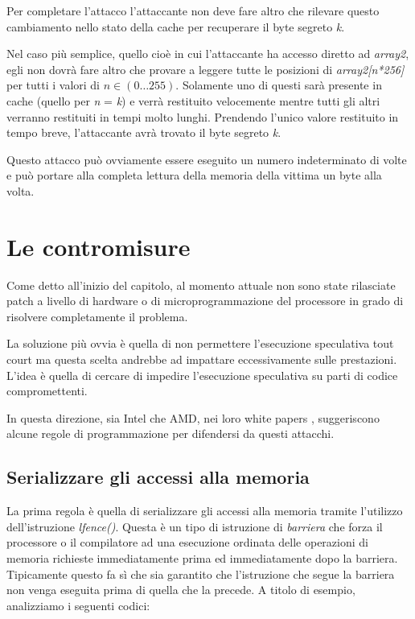 			Per completare l'attacco l'attaccante non deve fare altro che rilevare questo cambiamento nello stato della cache per recuperare il byte segreto \emph{k}.
			
			Nel caso più semplice, quello cioè in cui l'attaccante ha accesso diretto ad \emph{array2}, egli non dovrà fare altro che provare  a leggere tutte le posizioni di \emph{array2[n*256]} per tutti i valori di $n \in (0\dots255)$. Solamente uno di questi sarà presente in cache (quello per \emph{n} = \emph{k}) e verrà restituito velocemente mentre tutti gli altri verranno restituiti in tempi molto lunghi. Prendendo l'unico valore restituito in tempo breve, l'attaccante avrà trovato il byte segreto \emph{k}.
			
			Questo attacco può ovviamente essere eseguito un numero indeterminato di volte e può portare alla completa lettura della memoria della vittima un byte alla volta.
			
	\section{Le contromisure}
		Come detto all'inizio del capitolo, al momento attuale non sono state rilasciate patch a livello di hardware o di microprogrammazione del processore in grado di risolvere completamente il problema.
		
		La soluzione più ovvia è quella di non permettere l'esecuzione speculativa tout court ma questa scelta andrebbe ad impattare eccessivamente sulle prestazioni. L'idea è quella di cercare di impedire l'esecuzione speculativa su parti di codice compromettenti.
		
		In questa direzione, sia Intel che AMD, nei loro white papers \cite{AMD2018speculation,intel2018speculative}, suggeriscono alcune regole di programmazione per difendersi da questi attacchi.
		
		\subsection{Serializzare gli accessi alla memoria}
		
		La prima regola è quella di serializzare gli accessi alla memoria tramite l'utilizzo dell'istruzione \emph{lfence()}. Questa è un tipo di istruzione di \emph{barriera} che forza il processore o il compilatore ad una esecuzione ordinata delle operazioni di memoria richieste immediatamente prima ed immediatamente dopo la barriera. Tipicamente questo fa sì che sia garantito che l'istruzione che segue la barriera non venga eseguita prima di quella che la precede. A titolo di esempio, analizziamo i seguenti codici:
		
